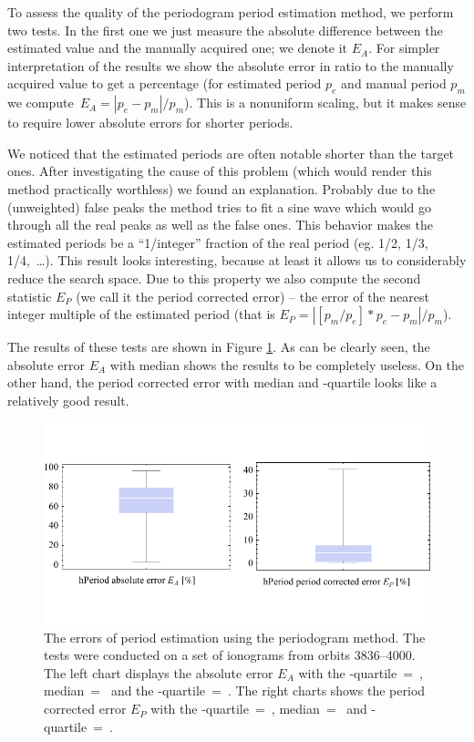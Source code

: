 To assess the quality of the periodogram period estimation method, we perform two tests. In the first one we just measure the absolute difference between the estimated value and the manually acquired one; we denote it $E_A$. For simpler interpretation of the results we show the absolute error in ratio to the manually acquired value to get a percentage (for estimated period $p_e$ and manual period $p_m$ we compute~$E_A=|p_e-p_m|/p_m$). This is a nonuniform scaling, but it makes sense to require lower absolute errors for shorter periods.

We noticed that the estimated periods are often notable shorter than the target ones. After investigating the cause of this problem (which would render this method practically worthless) we found an explanation. Probably due to the (unweighted) false peaks the method tries to fit a sine wave which would go through all the real peaks as well as the false ones. This behavior makes the estimated periods be a ``1/integer'' fraction of the real period (eg. 1/2, 1/3, 1/4,~\ldots). This result looks interesting, because at least it allows us to considerably reduce the search space. Due to this property we also compute the second statistic $E_P$ (we call it the period corrected error) -- the error of the nearest integer multiple of the estimated period (that is $E_P=|[p_m/p_e]*p_e-p_m|/p_m$).

The results of these tests are shown in Figure \ref{fig:periodogram_errors}. As can be clearly seen, the absolute error $E_A$ with median  shows the results to be completely useless. On the other hand, the period corrected error with median  and -quartile  looks like a relatively good result.   

\begin{figure}
	\centering
	\includegraphics[width=140mm]{images/periodogram_errors.pdf}
	\caption{The errors of period estimation using the periodogram method. The tests were conducted on a set of ionograms from orbits 3836--4000. The left chart displays the absolute error $E_A$ with the \mbox{-quartile}~=~, median~=~ and the \mbox{-quartile}~=~. The right charts shows the period corrected error $E_P$ with the \mbox{-quartile}~=~, median~=~ and \mbox{-quartile}~=~.}
	\label{fig:periodogram_errors}
\end{figure}

